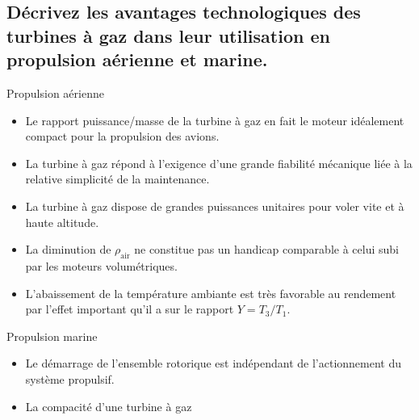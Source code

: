 \subsection{Décrivez les avantages technologiques des turbines à gaz dans leur utilisation en propulsion aérienne et marine.}
Propulsion aérienne
\begin{itemize}
\item Le rapport puissance/masse de la turbine à gaz en fait le moteur idéalement compact pour la propulsion des avions.
\item La turbine à gaz répond à l'exigence d'une grande fiabilité mécanique liée à la relative simplicité de la maintenance.
\item La turbine à gaz dispose de grandes puissances unitaires pour voler vite et à haute altitude.
\item La diminution de $\rho_\text{air}$ ne constitue pas un handicap comparable à celui subi par les moteurs volumétriques.
\item L'abaissement de la température ambiante est très favorable au rendement par l'effet important qu'il a sur le rapport $Y = T_3/T_1$.
\end{itemize}

Propulsion marine 
\begin{itemize}
\item Le démarrage de l'ensemble rotorique est indépendant de l'actionnement du système propulsif.
\item La compacité d'une turbine à gaz
\end{itemize}
